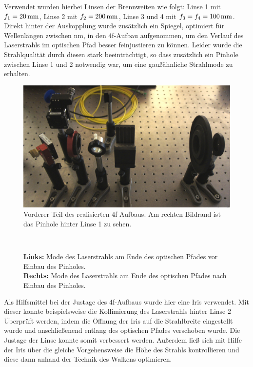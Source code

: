 Verwendet wurden hierbei Linsen der Brennweiten wie folgt: Linse 1 mit $f_{1}=\unit[20]{mm}$, Linse 2 mit $f_{2}=\unit[200]{mm}$, Linse 3 und 4 mit $f_{3}=f_{4}=\unit[100]{mm}$. Direkt hinter der Auskopplung wurde zusätzlich ein Spiegel, optimiert für Wellenlängen zwischen \unit[400-700]{nm}, in den 4f-Aufbau aufgenommen, um den Verlauf des Laserstrahls im optischen Pfad besser feinjustieren zu können. Leider wurde die Strahlqualität durch diesen stark beeinträchtigt, so dass zusätzlich ein Pinhole zwischen Linse 1 und 2 notwendig war, um eine gaußähnliche Strahlmode zu erhalten.\\


\begin{figure}[h]
	\centering
	\includegraphics[width=0.7\linewidth]{images/4f-anfang.JPG}
	\caption[Vorderer Teil des 4f-Aufbaus]{
		Vorderer Teil des realisierten 4f-Aufbaus. Am rechten Bildrand ist das Pinhole hinter Linse 1 zu sehen.
	}
	\label{fig:_DSC7961}
\end{figure}

\begin{figure}[ht]
	\centering
	~
	\caption{
		\textbf{Links:} Mode des Laserstrahls am Ende des optischen Pfades vor Einbau des Pinholes.\\
		\textbf{Rechts:} Mode des Laserstrahls am Ende des optischen Pfades nach Einbau des Pinholes.
	}
	\label{fig:_DSC7988}
\end{figure}


Als Hilfsmittel bei der Justage des 4f-Aufbaus wurde hier eine Iris verwendet. Mit dieser konnte beispielsweise die Kollimierung des Laserstrahls hinter Linse 2 Überprüft werden, indem die Öffnung der Iris auf die Strahlbreite eingestellt wurde und anschließenend entlang des optischen Pfades verschoben wurde. Die Justage der Linse konnte somit verbessert werden. Außerdem ließ sich mit Hilfe der Iris über die gleiche Vorgehensweise die Höhe des Strahls kontrollieren und diese dann anhand der Technik des Walkens optimieren. 


